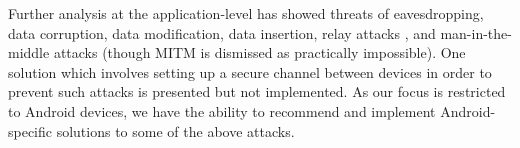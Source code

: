 \documentclass[12pt]{article}
\begin{document}

Further analysis at the application-level has showed threats of eavesdropping, data corruption, data modification, data insertion, relay attacks \cite{francis2012}, and man-in-the-middle attacks (though MITM is dismissed as practically impossible).
One solution \cite{haselsteiner2006} which involves setting up a secure channel between devices in order to prevent such attacks is presented but not implemented. As our focus is restricted to Android devices, we have the ability to recommend and implement Android-specific solutions to some of the above attacks. 
\end{document}
